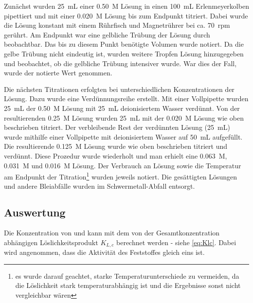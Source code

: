 \documentclass{article}
\begin{document}
      Zunächst wurden \SI[mode=text]{25}{\milli\liter} einer \SI[mode=text]{0.50}{M}  Lösung in einen \SI[mode=text]{100}{\milli\liter} Erlenmeyerkolben pipettiert und mit einer \SI[mode=text]{0.020}{M}  Lösung bis zum Endpunkt titriert. Dabei wurde die Lösung konstant mit einem Rührfisch und Magnetrührer bei ca. \SI[mode=text]{70}{rpm} gerührt. Am Endpunkt war eine gelbliche Trübung der Lösung durch  beobachtbar. Das bis zu diesem Punkt benötigte Volumen wurde notiert. Da die gelbe Trübung nicht eindeutig ist, wurden weitere Tropfen  Lösung hinzugegeben und beobachtet, ob die gelbliche Trübung intensiver wurde. War dies der Fall, wurde der notierte Wert genommen.
      
      Die nächsten Titrationen erfolgten bei unterschiedlichen Konzentrationen der  Lösung. Dazu wurde eine Verdünnungsreihe erstellt. Mit einer Vollpipette wurden \SI[mode=text]{25}{\milli\liter} der \SI[mode=text]{0.50}{M}  Lösung mit \SI[mode=text]{25}{\milli\liter} deionisiertem Wasser verdünnt. Von der resultierenden \SI[mode=text]{0.25}{M}  Lösung wurden \SI[mode=text]{25}{\milli\liter} mit der \SI[mode=text]{0.020}{M}  Lösung wie oben beschrieben titriert. Der verbleibende Rest der verdünnten Lösung (\SI[mode=text]{25}{\milli\liter}) wurde mithilfe einer Vollpipette mit deionisiertem Wasser auf \SI[mode=text]{50}{\milli\liter} aufgefüllt. Die resultierende \SI[mode=text]{0.125}{M}  Lösung wurde wie oben beschrieben titriert und verdünnt. Diese Prozedur wurde wiederholt und man erhielt eine \SI[mode=text]{0.063}{M}, \SI[mode=text]{0.031}{M} und \SI[mode=text]{0.016}{M}  Lösung. Der Verbrauch an  Lösung sowie die Temperatur am Endpunkt der Titration\footnote{es wurde darauf geachtet, starke Temperaturunterschiede zu vermeiden, da die Löslichkeit stark temperaturabhängig ist und die Ergebnisse sonst nicht vergleichbar wären} wurden jeweils notiert. Die gesättigten  Lösungen und andere Bleiabfälle wurden im Schwermetall-Abfall entsorgt.
    
    \pagebreak
    
    \subsection{Auswertung} \label{sec:Auswertung}
      
      Die Konzentration von  und  kann mit dem von der Gesamtkonzentration abhängigen Löslichkeitsprodukt $K_{L,c}$ berechnet werden - siehe \eqref{eq:Klc}. Dabei wird angenommen, dass die Aktivität des Feststoffes  gleich eins ist. 
      
\end{document}
